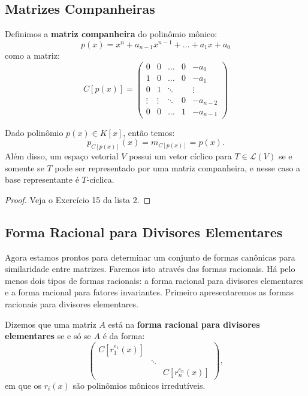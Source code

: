 \documentclass[11pt,twoside,a4paper]{book}
\begin{document}
\subsection{Matrizes Companheiras}

\begin{definicao}
Definimos a \textbf{matriz companheira} do polinômio mônico:
\[
p(x)=x^n+a_{n-1}x^{n-1}+\dots+a_1x+a_0
\]
como a matriz:
\[
C[p(x)]=\begin{pmatrix}
0&0&\ldots&0&-a_0\\1&0&\ldots&0&-a_1\\0&1&\ddots&&\vdots\\\vdots&\vdots&\ddots&0&-a_{n-2}\\0&0&\ldots&1&-a_{n-1}
\end{pmatrix}
\]
\end{definicao}

\begin{teorema}
Dado polinômio $p(x)\in K[x]$, então temos:
\[
p_{C[p(x)]}(x)=m_{C[p(x)]}=p(x).
\]
Além disso, um espaço vetorial $V$ possui um vetor cíclico para $T\in\mathcal{L}(V)$ se e somente se $T$ pode ser representado por uma matriz companheira, e nesse caso a base representante é $T$-cíclica.
\end{teorema}
\begin{proof}
Veja o Exercício 15 da lista 2.
\end{proof}

\subsection{Forma Racional para Divisores Elementares}

Agora estamos prontos para determinar um conjunto de formas canônicas para similaridade entre matrizes. Faremos isto através das formas racionais. Há pelo menos dois tipos de formas racionais: a forma racional para divisores elementares e a forma racional para fatores invariantes. Primeiro apresentaremos as formas racionais para divisores elementares.

\begin{definicao}
Dizemos que uma matriz $A$ está na \textbf{forma racional para divisores elementares} se e só se $A$ é da forma:
\[
\begin{pmatrix}
C[r_1^{e_1}(x)]&&\\&\ddots&\\&&C[r_n^{e_n}(x)]
\end{pmatrix},
\]
em que os $r_i(x)$ são polinômios mônicos irredutíveis.
\end{definicao}
\end{document}

